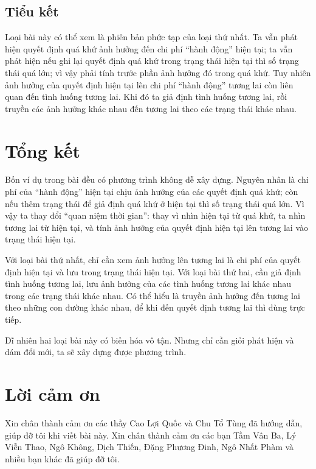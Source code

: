 \documentclass[11pt]{article}
\begin{document}
\subsection*{Tiểu kết}

Loại bài này có thể xem là phiên bản phức tạp của loại thứ nhất. Ta vẫn phát
hiện quyết định quá khứ ảnh hưởng đến chi phí ``hành động'' hiện tại; ta vẫn
phát hiện nếu ghi lại quyết định quá khứ trong trạng thái hiện tại thì số
trạng thái quá lớn; vì vậy phải tính trước phần ảnh hưởng đó trong quá khứ.
Tuy nhiên ảnh hưởng của quyết định hiện tại lên chi phí ``hành động'' tương
lai còn liên quan đến tình huống tương lai. Khi đó ta giả định tình huống
tương lai, rồi truyền các ảnh hưởng khác nhau đến tương lai theo các trạng
thái khác nhau.

\section{Tổng kết}

Bốn ví dụ trong bài đều có phương trình không dễ xây dựng. Nguyên nhân là chi
phí của ``hành động'' hiện tại chịu ảnh hưởng của các quyết định quá khứ; còn
nếu thêm trạng thái để giả định quá khứ ở hiện tại thì số trạng thái quá lớn.
Vì vậy ta thay đổi ``quan niệm thời gian'': thay vì nhìn hiện tại từ quá khứ,
ta nhìn tương lai từ hiện tại, và tính ảnh hưởng của quyết định hiện tại lên
tương lai vào trạng thái hiện tại.

Với loại bài thứ nhất, chỉ cần xem ảnh hưởng lên tương lai là chi phí của
quyết định hiện tại và lưu trong trạng thái hiện tại. Với loại bài thứ hai,
cần giả định tình huống tương lai, lưu ảnh hưởng của các tình huống tương lai
khác nhau trong các trạng thái khác nhau. Có thể hiểu là truyền ảnh hưởng đến
tương lai theo những con đường khác nhau, để khi đến quyết định tương lai thì
dùng trực tiếp.

Dĩ nhiên hai loại bài này có biến hóa vô tận. Nhưng chỉ cần giỏi phát hiện và
dám đổi mới, ta sẽ xây dựng được phương trình.

\section*{Lời cảm ơn}

Xin chân thành cảm ơn các thầy Cao Lợi Quốc và Chu Tổ Tùng đã hướng dẫn, giúp
đỡ tôi khi viết bài này. Xin chân thành cảm ơn các bạn Tầm Vân Ba, Lý Viễn
Thao, Ngô Không, Dịch Thiến, Đặng Phương Đinh, Ngô Nhất Phàm và nhiều bạn khác
đã giúp đỡ tôi.
\end{document}

